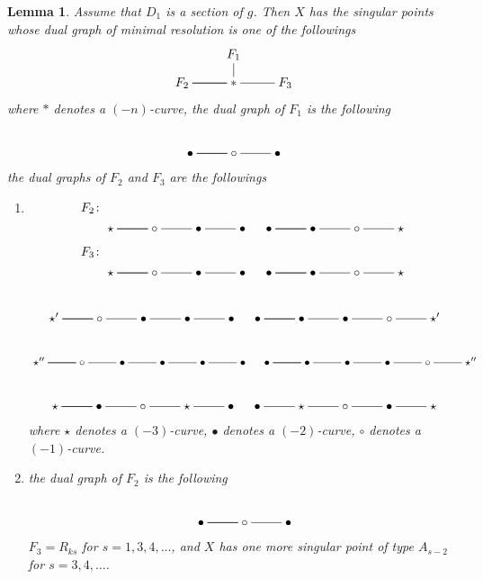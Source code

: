 \documentclass[10pt,oneside,reqno]{amsart}
\newtheorem{lemma}[theorem]{Lemma}
\theoremstyle{definition}
\theoremstyle{remark}
\numberwithin{equation}{section}
\begin{document}
\begin{lemma}
\label{DE4}
Assume that $D_1$ is a section of $g$. Then $X$ has the singular points whose dual graph of minimal resolution is one of the followings
$$
\xymatrix@R=0.8em{
&F_1\ar@{-}[d]&\\
F_2\ar@{-}[r]\ar@{-}[r]&\ast\ar@{-}[r]& F_3
}
$$ where $\ast$ denotes a $(-n)$-curve, the dual graph of $F_1$ is the following
$$
\xymatrix@R=0.8em{\\
\bullet\ar@{-}[r]\ar@{-}[r]&\circ\ar@{-}[r]&\bullet
}
$$
the dual graphs of $F_2$ and $F_3$ are the followings
\begin{enumerate}
\item $$F_2\colon\xymatrix@R=0.8em{\\
\star\ar@{-}[r]\ar@{-}[r]&\circ\ar@{-}[r]&\bullet\ar@{-}[r]&\bullet
}\quad \xymatrix@R=0.8em{\\
\bullet\ar@{-}[r]\ar@{-}[r]&\bullet\ar@{-}[r]&\circ\ar@{-}[r]&\star
}$$
$$F_3\colon\xymatrix@R=0.8em{\\
\star\ar@{-}[r]\ar@{-}[r]&\circ\ar@{-}[r]&\bullet\ar@{-}[r]&\bullet
}\quad \xymatrix@R=0.8em{\\
\bullet\ar@{-}[r]\ar@{-}[r]&\bullet\ar@{-}[r]&\circ\ar@{-}[r]&\star
}$$
$$\xymatrix@R=0.8em{\\
\star'\ar@{-}[r]\ar@{-}[r]&\circ\ar@{-}[r]&\bullet\ar@{-}[r]&\bullet\ar@{-}[r]&\bullet
}\quad \xymatrix@R=0.8em{\\
\bullet\ar@{-}[r]\ar@{-}[r]&\bullet\ar@{-}[r]&\bullet\ar@{-}[r]&\circ\ar@{-}[r]&\star'
}$$
$$\xymatrix@R=0.8em{\\
\star''\ar@{-}[r]\ar@{-}[r]&\circ\ar@{-}[r]&\bullet\ar@{-}[r]&\bullet\ar@{-}[r]&\bullet\ar@{-}[r]&\bullet
}\quad \xymatrix@R=0.8em{\\
\bullet\ar@{-}[r]\ar@{-}[r]&\bullet\ar@{-}[r]&\bullet\ar@{-}[r]&\bullet\ar@{-}[r]&\circ\ar@{-}[r]&\star''
}$$
$$\xymatrix@R=0.8em{\\
\star\ar@{-}[r]\ar@{-}[r]&\bullet\ar@{-}[r]&\circ\ar@{-}[r]&\star\ar@{-}[r]&\bullet
}\quad \xymatrix@R=0.8em{\\
\bullet\ar@{-}[r]&\star\ar@{-}[r]&\circ\ar@{-}[r]&\bullet\ar@{-}[r]&\star
}$$ where $\star$ denotes a $(-3)$-curve, $\bullet$ denotes a $(-2)$-curve, $\circ$ denotes a $(-1)$-curve.
\item the dual graph of $F_2$ is the following  $$
\xymatrix@R=0.8em{\\
\bullet\ar@{-}[r]\ar@{-}[r]&\circ\ar@{-}[r]&\bullet
}
$$ $F_3=R_{ks}$ for $s=1,3,4,\ldots$, and $X$ has one more singular point of type $A_{s-2}$ for $s=3,4,\ldots$.
\end{enumerate}
\end{lemma}
\end{document}
